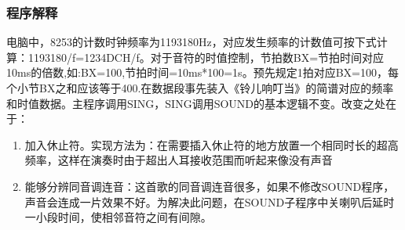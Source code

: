 \documentclass[12pt, a4paper, oneside]{ctexart}
\begin{document}
\subsubsection{程序解释}
电脑中，8253的计数时钟频率为1193180Hz，对应发生频率的计数值可按下式计算：1193180/f=1234DCH/f。对于音符的时值控制，节拍数BX=节拍时间对应10ms的倍数,如:BX=100,节拍时间=10ms*100=1s。预先规定1拍对应BX=100，每个小节BX之和应该等于400.在数据段事先装入《铃儿响叮当》的简谱对应的频率和时值数据。主程序调用SING，SING调用SOUND的基本逻辑不变。改变之处在于：
\begin{enumerate}
    \item 加入休止符。实现方法为：在需要插入休止符的地方放置一个相同时长的超高频率，这样在演奏时由于超出人耳接收范围而听起来像没有声音
    \item 能够分辨同音调连音：这首歌的同音调连音很多，如果不修改SOUND程序，声音会连成一片效果不好。为解决此问题，在SOUND子程序中关喇叭后延时一小段时间，使相邻音符之间有间隙。
\end{enumerate}
\end{document}
